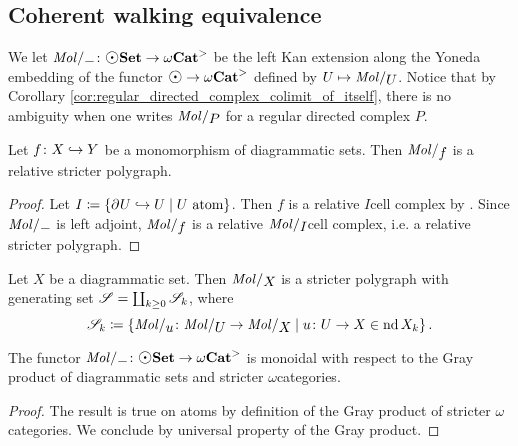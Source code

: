 \subsection{Coherent walking equivalence}

We let \( \molecin{-} \colon \dgmSet \to \somegaCat \) be the left Kan extension along the Yoneda embedding of the functor \( \atom \to \somegaCat \) defined by \( U \mapsto \molecin{U} \).
Notice that by Corollary \ref{cor:regular_directed_complex_colimit_of_itself}, there is no ambiguity when one writes \( \molecin{P} \) for a regular directed complex \( P \).

\begin{lem} \label{lem:molecin_preserves_cofibration}
    Let \( f \colon X \hookrightarrow Y \) be a monomorphism of diagrammatic sets.
    Then \( \molecin{f} \) is a relative stricter polygraph.
\end{lem}
\begin{proof}
    Let \( I \coloneqq \left\{ {\partial_{}^{} U \hookrightarrow U \mid U \text{ atom}} \right\} \).
    Then \( f \) is a relative \( I \)\nbd cell complex by \cite[Remark 2.9]{chanavat2024htpy}.
    Since \( \molecin{-} \) is left adjoint, \( \molecin{f} \) is a relative \( \molecin{I} \)\nbd cell complex, i.e. a relative stricter polygraph.
\end{proof}

\begin{cor} \label{cor:molecin_polygraph_with_basis}
    Let \( X \) be a diagrammatic set. 
    Then \( \molecin{X} \) is a stricter polygraph with generating set \( \mathscr{S} = \coprod_{k \geq 0} \mathscr{S}_k \), where
    \begin{equation*}
        \cls{S}_k \eqdef \set{\molecin{u} \colon \molecin{U} \to \molecin{X} \mid u \colon U \to X \in \gr{k}{\nd X}}.
    \end{equation*}
\end{cor}

\begin{lem} \label{lem:molecin_monoidal}
    The functor \( \molecin{-} \colon \dgmSet \to \somegaCat \) is monoidal with respect to the Gray product of diagrammatic sets and stricter \( \omega \)\nbd categories.
\end{lem}
\begin{proof}
    The result is true on atoms by definition of the Gray product of stricter \( \omega \)\nbd categories.
    We conclude by universal property of the Gray product.
\end{proof}


